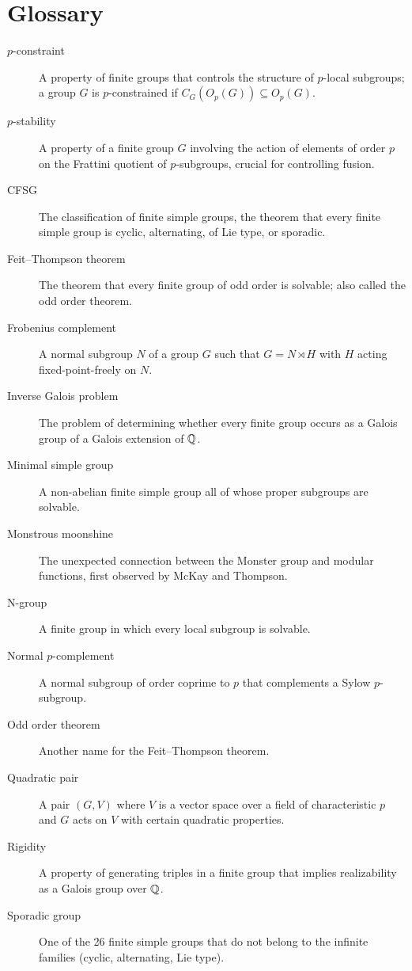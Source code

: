 \section*{Glossary}

\begin{description}
\item[\(p\)-constraint] A property of finite groups that controls the structure of \(p\)-local subgroups; a group \(G\) is \(p\)-constrained if \(C_G(O_p(G)) \subseteq O_p(G)\).
\item[\(p\)-stability] A property of a finite group \(G\) involving the action of elements of order \(p\) on the Frattini quotient of \(p\)-subgroups, crucial for controlling fusion.
\item[CFSG] The classification of finite simple groups, the theorem that every finite simple group is cyclic, alternating, of Lie type, or sporadic.
\item[Feit--Thompson theorem] The theorem that every finite group of odd order is solvable; also called the odd order theorem.
\item[Frobenius complement] A normal subgroup \(N\) of a group \(G\) such that \(G = N \rtimes H\) with \(H\) acting fixed-point-freely on \(N\).
\item[Inverse Galois problem] The problem of determining whether every finite group occurs as a Galois group of a Galois extension of \(\mathbb{Q}\).
\item[Minimal simple group] A non-abelian finite simple group all of whose proper subgroups are solvable.
\item[Monstrous moonshine] The unexpected connection between the Monster group and modular functions, first observed by McKay and Thompson.
\item[N-group] A finite group in which every local subgroup is solvable.
\item[Normal \(p\)-complement] A normal subgroup of order coprime to \(p\) that complements a Sylow \(p\)-subgroup.
\item[Odd order theorem] Another name for the Feit--Thompson theorem.
\item[Quadratic pair] A pair \((G,V)\) where \(V\) is a vector space over a field of characteristic \(p\) and \(G\) acts on \(V\) with certain quadratic properties.
\item[Rigidity] A property of generating triples in a finite group that implies realizability as a Galois group over \(\mathbb{Q}\).
\item[Sporadic group] One of the 26 finite simple groups that do not belong to the infinite families (cyclic, alternating, Lie type).

\end{description}
